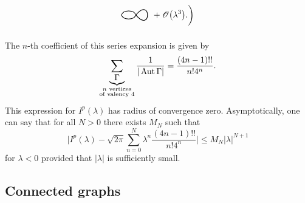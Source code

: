 \begin{example}
\begin{align*}
\begin{tikzpicture}[scale=2, baseline=-1mm]
        \draw[thick] (.3, 0) to[out=-50, in=50, loop] (.3, 0);
        \draw[thick] (0, 0) to[out=70, in=110] (.3, 0);
        \draw[thick] (0, 0) to[out=-70, in=-110] (.3, 0);
      \end{tikzpicture}
      + \Oscr \bigl(\lambda^3\bigr).
    \biggr) 
  \end{align*}
  The $n$-th coefficient of this series expansion is given by
  \begin{equation*}
    \sum_{\underbrace{\Gamma}_{\substack{n\text{ vertices} \\ \text{of valency } 4}}} \frac{1}{|\operatorname{Aut} \Gamma|}
    = \frac{(4n - 1)!!}{n! 4^n}.
  \end{equation*}
  This expression for $I^p (\lambda)$ has radius of convergence zero. Asymptotically, one can say that for all $N > 0$ there exists $M_N$ such that
  \begin{equation*}
    \biggl| I^p(\lambda) - \sqrt{2 \pi} \sum_{n=0}^N \lambda^n \frac{(4n - 1)!!}{n! 4^n} \biggr|
    \leq M_N |\lambda|^{N + 1}
  \end{equation*}
  for $\lambda < 0$ provided that $|\lambda|$ is sufficiently small.
\end{example}

\subsection{Connected graphs}
